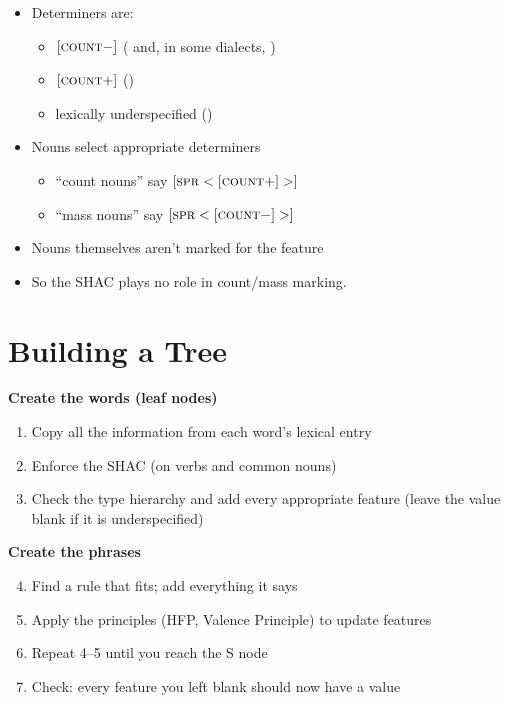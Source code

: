 \documentclass[a4paper,landscape,headrule,footrule]{foils}
\begin{document}
\begin{itemize}
\item Determiners are:
\begin{itemize}
  \item $[\textsc{count} -]$ ( and, in some dialects, )
  \item $[\textsc{count} +]$ ()
  \item lexically underspecified ()
  \end{itemize}
\item Nouns select appropriate determiners
  \begin{itemize}
  \item “count nouns” say $[\textsc{spr} < [\textsc{count} +] >]$
  \item “mass nouns” say $[\textsc{spr} < [\textsc{count} -] >]$
  \end{itemize}
\item Nouns themselves aren’t marked for the feature 
\item So the SHAC plays no role in count/mass marking.
\end{itemize}

\section{Building a Tree}

\small
\textbf{Create the words (leaf nodes)}
\begin{enumerate}
\item Copy all the information from each word's lexical entry
\item Enforce the SHAC (on verbs and common nouns)
\item Check the type hierarchy and add every appropriate feature
  (leave the value blank if it is underspecified)
\end{enumerate}
\textbf{Create the phrases}
\begin{enumerate}\setcounter{enumi}{3}
\item Find a rule that fits; add everything it says
\item Apply the principles (HFP, Valence Principle) to update features
\item Repeat 4--5 until you reach the S node
\item Check: every feature you left blank should now have a value
\end{enumerate}
\normalsize
\end{document}
